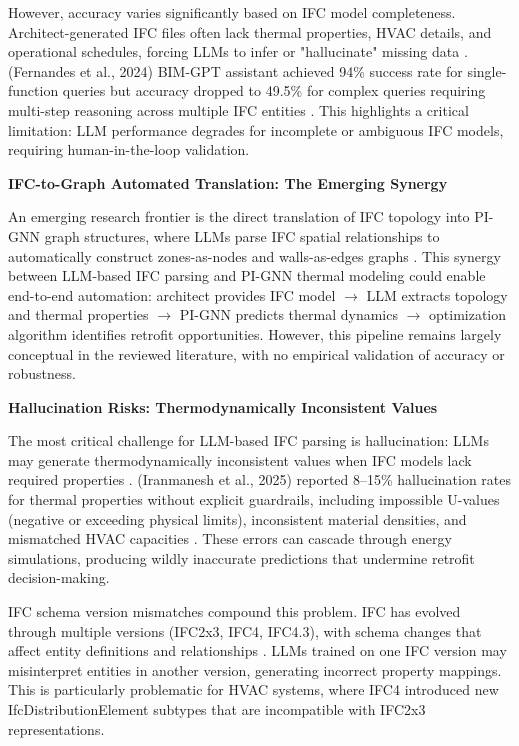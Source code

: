 \documentclass[12pt,a4paper]{article}
\begin{document}
However, accuracy varies significantly based on IFC model completeness. Architect-generated IFC files often lack thermal properties, HVAC details, and operational schedules, forcing LLMs to infer or "hallucinate" missing data \cite{ref52}. (Fernandes et al., 2024) BIM-GPT assistant achieved 94\% success rate for single-function queries but accuracy dropped to 49.5\% for complex queries requiring multi-step reasoning across multiple IFC entities \cite{ref53}. This highlights a critical limitation: LLM performance degrades for incomplete or ambiguous IFC models, requiring human-in-the-loop validation.

\textbf{IFC-to-Graph Automated Translation: The Emerging Synergy}

An emerging research frontier is the direct translation of IFC topology into PI-GNN graph structures, where LLMs parse IFC spatial relationships to automatically construct zones-as-nodes and walls-as-edges graphs \cite{ref54}. This synergy between LLM-based IFC parsing and PI-GNN thermal modeling could enable end-to-end automation: architect provides IFC model $\rightarrow$ LLM extracts topology and thermal properties $\rightarrow$ PI-GNN predicts thermal dynamics $\rightarrow$ optimization algorithm identifies retrofit opportunities. However, this pipeline remains largely conceptual in the reviewed literature, with no empirical validation of accuracy or robustness.

\textbf{Hallucination Risks: Thermodynamically Inconsistent Values}

The most critical challenge for LLM-based IFC parsing is hallucination: LLMs may generate thermodynamically inconsistent values when IFC models lack required properties \cite{ref55}. (Iranmanesh et al., 2025) reported 8--15\% hallucination rates for thermal properties without explicit guardrails, including impossible U-values (negative or exceeding physical limits), inconsistent material densities, and mismatched HVAC capacities \cite{ref56}. These errors can cascade through energy simulations, producing wildly inaccurate predictions that undermine retrofit decision-making.

IFC schema version mismatches compound this problem. IFC has evolved through multiple versions (IFC2x3, IFC4, IFC4.3), with schema changes that affect entity definitions and relationships \cite{ref57}. LLMs trained on one IFC version may misinterpret entities in another version, generating incorrect property mappings. This is particularly problematic for HVAC systems, where IFC4 introduced new IfcDistributionElement subtypes that are incompatible with IFC2x3 representations.
\end{document}
